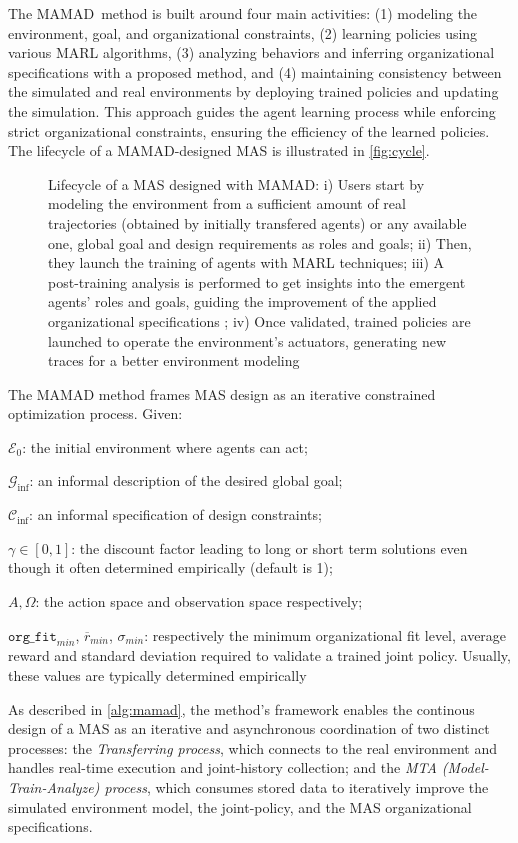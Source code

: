 \documentclass[pdflatex,sn-mathphys-num]{sn-jnl}%
\theoremstyle{thmstyleone}%
\theoremstyle{thmstyletwo}%
\theoremstyle{thmstylethree}%
\begin{document}
The MAMAD~\footnotemark[1] method is built around four main activities: (1) modeling the environment, goal, and organizational constraints, (2) learning policies using various MARL algorithms, (3) analyzing behaviors and inferring organizational specifications with a proposed method, and (4) maintaining consistency between the simulated and real environments by deploying trained policies and updating the simulation. This approach guides the agent learning process while enforcing strict organizational constraints, ensuring the efficiency of the learned policies. The lifecycle of a MAMAD-designed MAS is illustrated in \autoref{fig:cycle}.
%
\begin{figure}[h!]
    \centering
    
    \caption{Lifecycle of a MAS designed with MAMAD: i) Users start by modeling the environment from a sufficient amount of real trajectories (obtained by initially transfered agents) or any available one, global goal and design requirements as roles and goals; \quad ii) Then, they launch the training of agents with MARL techniques; \quad iii) A post-training analysis is performed to get insights into the emergent agents' roles and goals, guiding the improvement of the applied organizational specifications ; \quad iv) Once validated, trained policies are launched to operate the environment's actuators, generating new traces for a better environment modeling}
    \label{fig:cycle}
\end{figure}
%
The MAMAD method frames MAS design as an iterative constrained optimization process. Given:
\begin{enumerate*}[label={\roman*)}, itemjoin={; \quad}]
    \item $\mathcal{E}_0$: the initial environment where agents can act;
    \item $\mathcal{G}_{\text{inf}}$: an informal description of the desired global goal;
    \item $\mathcal{C}_{\text{inf}}$: an informal specification of design constraints;
    \item $\gamma \in [0,1]$: the discount factor leading to long or short term solutions even though it often determined empirically (default is 1);
    \item $A, \Omega$: the action space and observation space respectively;
    \item $\texttt{org\_fit}_{min}$, $\overline{r}_{min}$, $\sigma_{min}$: respectively the minimum organizational fit level, average reward and standard deviation required to validate a trained joint policy. Usually, these values are typically determined empirically
\end{enumerate*}
%
\noindent As described in \autoref{alg:mamad}, the method's framework enables the continous design of a MAS as an iterative and asynchronous coordination of two distinct processes: the \textit{Transferring process}, which connects to the real environment and handles real-time execution and joint-history collection; and the \textit{MTA (Model-Train-Analyze) process}, which consumes stored data to iteratively improve the simulated environment model, the joint-policy, and the MAS organizational specifications.
\end{document}
